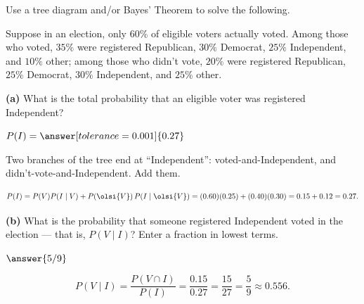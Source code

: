 \documentclass[12pt]{ximera}
\begin{document}
\begin{problem}
Use a tree diagram and/or Bayes' Theorem to solve the following.

Suppose in an election, only $60\%$ of eligible voters actually voted. Among those who
voted, $35\%$ were registered Republican, $30\%$ Democrat, $25\%$ Independent, and $10\%$
other; among those who didn't vote, $20\%$ were registered Republican, $25\%$ Democrat,
$30\%$ Independent, and $25\%$ other.

\begin{prompt}
\textbf{(a)} What is the total probability that an eligible voter was registered
Independent?

$P(I) = \answer[tolerance=0.001]{0.27}$

\begin{hint}
Two branches of the tree end at ``Independent'': voted-and-Independent, and
didn't-vote-and-Independent. Add them.
\end{hint}

\begin{feedback}
\[
P(I)=P(V)P(I\mid V)+P\!\left(\olsi{V}\right)P\!\left(I\mid\olsi{V}\right)
=(0.60)(0.25)+(0.40)(0.30)=0.15+0.12=0.27.
\]
\end{feedback}
\end{prompt}

\begin{prompt}
\textbf{(b)} What is the probability that someone registered Independent voted in the
election --- that is, $P(V\mid I)$? Enter a fraction in lowest terms.

$\answer{5/9}$

\begin{feedback}
\[
P(V\mid I)=\frac{P(V\cap I)}{P(I)}=\frac{0.15}{0.27}=\frac{15}{27}=\frac59\approx 0.556.
\]
\end{feedback}
\end{prompt}
\end{problem}
\end{document}
